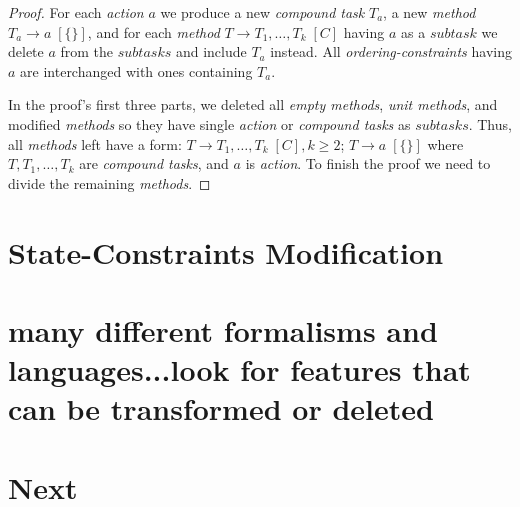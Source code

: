 \begin{proof}
    For each \emph{action} $a$ we produce a new \emph{compound task} $T_a$, a new \emph{method} $T_a \rightarrow a \; [\{\}]$, and for each \emph{method} $T \rightarrow T_1, \dots, T_k \; [C]$ having $a$ as a $subtask$ we delete $a$ from the $subtasks$ and include $T_a$ instead. All \emph{ordering-constraints} having $a$ are interchanged with ones containing $T_a$. 

    In the proof's first three parts, we deleted all \emph{empty methods}, \emph{unit methods}, and modified \emph{methods} so they have single \emph{action} or \emph{compound tasks} as $subtasks$. Thus, all \emph{methods} left have a form: $T \rightarrow T_1, \dots, T_k \; [C], k \geq 2$; $T \rightarrow a \; [\{\}]$ where $T, T_1, \dots, T_k$ are \emph{compound tasks}, and $a$ is \emph{action}. To finish the proof we need to divide the remaining \emph{methods}.

\end{proof}

\section{State-Constraints Modification}

\section{many different formalisms and languages...look for features that can be transformed or deleted}
\cite{hddl}

\section{Next}